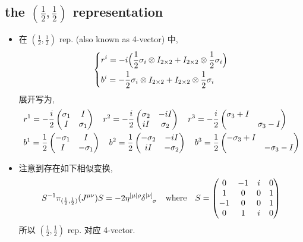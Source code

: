 \subsection{the \texorpdfstring{$(\frac{1}{2}, \frac{1}{2})$}{(1/2, 0)} representation}
\begin{itemize}
	\item 在 $(\frac{1}{2}, \frac{1}{2})$ rep. (also known as 4-vector) 中,
	\begin{equation}
		\begin{dcases}
			r^i = - i \Big( \frac{1}{2} \sigma_i \otimes I_{2 \times 2} + I_{2 \times 2} \otimes \frac{1}{2} \sigma_i \Big) \\
			b^i = - \frac{1}{2} \sigma_i \otimes I_{2 \times 2} + I_{2 \times 2} \otimes \frac{1}{2} \sigma_i
		\end{dcases}
	\end{equation}
	展开写为,
	\begin{align}
		& r^1 = - \frac{i}{2} \begin{pmatrix}
			\sigma_1 & I \\
			I & \sigma_1
		\end{pmatrix} \quad r^2 = - \frac{i}{2} \begin{pmatrix}
			\sigma_2 & - i I \\
			i I & \sigma_2
		\end{pmatrix} \quad r^3 = - \frac{i}{2} \begin{pmatrix}
			\sigma_3 + I & \\
			& \sigma_3 - I
		\end{pmatrix} \notag \\
		& b^1 = \frac{1}{2} \begin{pmatrix}
			- \sigma_1 & I \\
			I & - \sigma_1
		\end{pmatrix} \quad b^2 = \frac{1}{2} \begin{pmatrix}
			- \sigma_2 & - i I \\
			i I & - \sigma_2
		\end{pmatrix} \quad b^3 = \frac{1}{2} \begin{pmatrix}
			- \sigma_3 + I & \\
			& - \sigma_3 - I
		\end{pmatrix}
	\end{align}
	
	\item 注意到存在如下相似变换,
	\begin{equation}
		S^{- 1} \pi_{(\frac{1}{2}, \frac{1}{2})}(J^{\mu \nu}) S = - 2 \eta^{[\mu| \rho} \tensor{\delta}{^{|\nu]}_\sigma} \quad \text{where} \quad S = \begin{pmatrix}
			0 & - 1 & i & 0 \\
			1 & 0 & 0 & 1 \\
			- 1 & 0 & 0 & 1 \\
			0 & 1 & i & 0
		\end{pmatrix}
	\end{equation}
	所以 $(\frac{1}{2}, \frac{1}{2})$ rep. 对应 4-vector.
\end{itemize}

